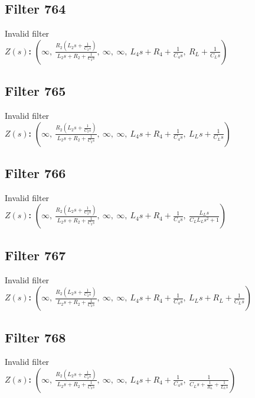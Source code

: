 \documentclass{article}
\begin{document}
\subsection*{Filter 764}
Invalid filter \\ 
\textbf{$Z(s)$:} $\left( \infty, \  \frac{R_{2} \left(L_{2} s + \frac{1}{C_{2} s}\right)}{L_{2} s + R_{2} + \frac{1}{C_{2} s}}, \  \infty, \  \infty, \  L_{4} s + R_{4} + \frac{1}{C_{4} s}, \  R_{L} + \frac{1}{C_{L} s}\right)$ \\ 
\subsection*{Filter 765}
Invalid filter \\ 
\textbf{$Z(s)$:} $\left( \infty, \  \frac{R_{2} \left(L_{2} s + \frac{1}{C_{2} s}\right)}{L_{2} s + R_{2} + \frac{1}{C_{2} s}}, \  \infty, \  \infty, \  L_{4} s + R_{4} + \frac{1}{C_{4} s}, \  L_{L} s + \frac{1}{C_{L} s}\right)$ \\ 
\subsection*{Filter 766}
Invalid filter \\ 
\textbf{$Z(s)$:} $\left( \infty, \  \frac{R_{2} \left(L_{2} s + \frac{1}{C_{2} s}\right)}{L_{2} s + R_{2} + \frac{1}{C_{2} s}}, \  \infty, \  \infty, \  L_{4} s + R_{4} + \frac{1}{C_{4} s}, \  \frac{L_{L} s}{C_{L} L_{L} s^{2} + 1}\right)$ \\ 
\subsection*{Filter 767}
Invalid filter \\ 
\textbf{$Z(s)$:} $\left( \infty, \  \frac{R_{2} \left(L_{2} s + \frac{1}{C_{2} s}\right)}{L_{2} s + R_{2} + \frac{1}{C_{2} s}}, \  \infty, \  \infty, \  L_{4} s + R_{4} + \frac{1}{C_{4} s}, \  L_{L} s + R_{L} + \frac{1}{C_{L} s}\right)$ \\ 
\subsection*{Filter 768}
Invalid filter \\ 
\textbf{$Z(s)$:} $\left( \infty, \  \frac{R_{2} \left(L_{2} s + \frac{1}{C_{2} s}\right)}{L_{2} s + R_{2} + \frac{1}{C_{2} s}}, \  \infty, \  \infty, \  L_{4} s + R_{4} + \frac{1}{C_{4} s}, \  \frac{1}{C_{L} s + \frac{1}{R_{L}} + \frac{1}{L_{L} s}}\right)$ \\ 
\end{document}
